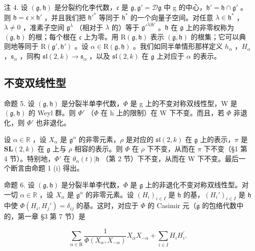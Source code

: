 注 4. 设 \((\mathfrak{g},\mathfrak{h})\) 是分裂约化李代数，\(\mathfrak{c}\) 是 \(\mathfrak{g},\mathfrak{g}' = \mathcal{D}\mathfrak{g}\) 中 g 的中心，\(\mathfrak{h}' = \mathfrak{h} \cap \mathfrak{g}'\) 。则 \(\mathfrak{h} = \mathfrak{c} \times \mathfrak{h}'\) ，并且我们把 \(\mathfrak{h}'^*\) 等同于 \(\mathfrak{h}^*\) 的一个向量子空间。对任意 \(\lambda \in \mathfrak{h}^*\) ，\(\lambda \neq 0\) ，准素子空间 \(\mathfrak{g}^\lambda\) （相对于 \(\lambda\) 的）等于 \(\mathfrak{g}'^{\lambda | \mathfrak{h}'}\) 。\(\mathfrak{h}\) 在 \(\mathfrak{g}\) 上的非零权称为 \((\mathfrak{g},\mathfrak{h})\) 的根；每个根在 \(\mathfrak{c}\) 上为零。用 \(\mathrm{R}(\mathfrak{g},\mathfrak{h})\) 表示 \((\mathfrak{g},\mathfrak{h})\) 的根集；它可以典则地等同于 \(\mathrm{R}(\mathfrak{g}',\mathfrak{h}')\) 。设 \(\alpha \in \mathrm{R}(\mathfrak{g},\mathfrak{h})\) 。我们如同半单情形那样定义 \(h_\alpha\) ，\(H_\alpha\) ，\(\mathfrak{s}_\alpha\) ，同构 \(\mathfrak{sl}(2,k) \to \mathfrak{s}_\alpha\) ，以及 \(\mathfrak{sl}(2,k)\) 在 \(\mathfrak{g}\) 上对应于 \(\alpha\) 的表示。

\subsection{不变双线性型}

命题 5. 设 \((\mathfrak{g},\mathfrak{h})\) 是分裂半单李代数，\(\Phi\) 是 g 上的不变对称双线性型，W 是 \((\mathfrak{g},\mathfrak{h})\) 的 Weyl 群。则 \(\Phi'\) （\(\Phi\) 在 h 上的限制）在 W 下不变。而且，若 \(\Phi\) 非退化，则 \(\Phi'\) 也非退化。

设 \(\alpha \in \mathbb{R}\) ，设 \(X_{\alpha}\) 是 \(\mathfrak{g}^{\alpha}\) 的非零元素，\(\rho\) 是对应的 \(\mathfrak{sl}(2,k)\) 在 \(\mathfrak{g}\) 上的表示，\(\pi\) 是 \(\mathbf{SL}(2,k)\) 在 \(\mathfrak{g}\) 上与 \(\rho\) 相容的表示。则 \(\varPhi\) 在 \(\rho\) 下不变，从而在 \(\pi\) 下不变（§1 第 4 节）。特别地，\(\varPhi'\) 在 \(\theta_{\alpha}(t)|\mathfrak{h}\) （第 2 节）下不变，从而在 W 下不变。最后一个断言由命题 1 (i) 得出。

命题 6. 设 \((\mathfrak{g},\mathfrak{h})\) 是分裂半单李代数，\(\varPhi\) 是 \(\mathfrak{g}\) 上的非退化不变对称双线性型。对一切 \(\alpha \in \mathbb{R}\) ，设 \(X_{\alpha}\) 是 \(\mathfrak{g}^{\alpha}\) 的非零元素。设 \((H_i)_{i\in I}\) 是 \(\mathfrak{h}\) 的基，\((H_i')_{i\in I}\) 是 \(\mathfrak{h}\) 中使 \(\varPhi(H_i,H_j') = \delta_{ij}\) 的基。这时，对应于 \(\varPhi\) 的 Casimir 元（\(\mathfrak{g}\) 的包络代数中的，第一章 §3 第 7 节）是

\[
\sum_ {\alpha \in \mathrm{R}} \frac {1}{\varPhi (X _ {\alpha} , X _ {- \alpha})} X _ {\alpha} X _ {- \alpha} + \sum_ {i \in I} H _ {i} H _ {i} ^ {\prime}.
\]

